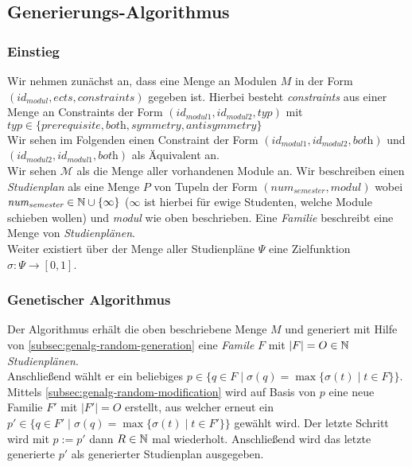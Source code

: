 \subsection{Generierungs-Algorithmus}

\newcommand{\id}[1]{\textit{id}_{#1}}
\newenvironment{nstabbing}{
	\setlength{\topsep}{-\parskip}%
	\setlength{\partopsep}{0pt}%
	\tabbing
}{\endtabbing}

\subsubsection{Einstieg}
Wir nehmen zunächst an, dass eine Menge an Modulen $M$ in der Form $(\id{\textit{modul}}, \textit{ects}, \textit{constraints})$ gegeben ist.
Hierbei besteht \textit{constraints} aus einer Menge an Constraints der Form $(\id{\textit{modul1}}, \id{\textit{modul2}}, \textit{typ})$ mit $\textit{typ} \in \{\textit{prerequisite}, \textit{both}, \textit{symmetry}, \textit{antisymmetry}\}$ \\
Wir sehen im Folgenden einen Constraint der Form $(\id{\textit{modul1}}, \id{\textit{modul2}}, \textit{both})$ und $(\id{\textit{modul2}}, \id{\textit{modul1}}, \textit{both})$ als Äquivalent an.\\
Wir sehen $ \mathcal{M} $ als die Menge aller vorhandenen Module an.
Wir beschreiben einen \textit{Studienplan} als eine Menge $P$ von Tupeln der Form $(\textit{num}_{\textit{semester}}, \textit{modul})$ wobei $\textit{num}_{\textit{semester}} \in \mathbb{N} \cup \{\infty\}$ ($\infty$ ist hierbei für ewige Studenten, welche Module schieben wollen) und \textit{modul} wie oben beschrieben. Eine \textit{Familie} beschreibt eine Menge von \textit{Studienplänen}.\\
Weiter existiert über der Menge aller Studienpläne $\Psi$ eine Zielfunktion  $\sigma : \Psi \to [0,1]$.

\subsubsection{Genetischer Algorithmus}
Der Algorithmus erhält die oben beschriebene Menge $M$ und generiert mit Hilfe von  \ref{subsec:genalg-random-generation} eine \textit{Famile} $F$ mit $|F| = O \in \mathbb{N}$ \textit{Studienplänen}.\\
Anschließend wählt er ein beliebiges $p \in \{q \in F \mid \sigma(q)=\max \{\sigma(t) \mid t \in F \} \}$.\\
Mittels \ref{subsec:genalg-random-modification} wird auf Basis von $p$ eine neue Familie $F'$ mit $|F'| = O$ erstellt, aus welcher erneut ein $p' \in \{q \in F' \mid \sigma(q) = \max \{\sigma(t) \mid t \in F' \} \}$ gewählt wird. Der letzte Schritt wird mit $p := p'$ dann $R \in \mathbb{N}$ mal wiederholt.
Anschließend wird das letzte generierte $p'$ als generierter Studienplan ausgegeben.

